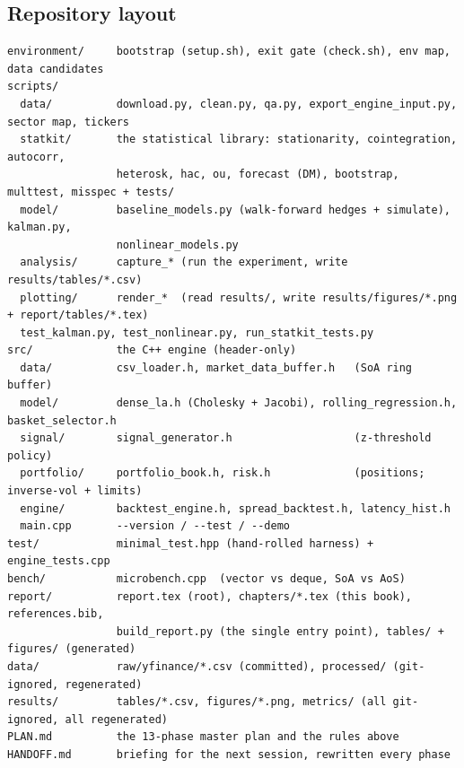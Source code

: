\subsection{Repository layout}
\label{sec:phasemap:layout}

\begin{verbatim}
environment/     bootstrap (setup.sh), exit gate (check.sh), env map, data candidates
scripts/
  data/          download.py, clean.py, qa.py, export_engine_input.py, sector map, tickers
  statkit/       the statistical library: stationarity, cointegration, autocorr,
                 heterosk, hac, ou, forecast (DM), bootstrap, multtest, misspec + tests/
  model/         baseline_models.py (walk-forward hedges + simulate), kalman.py,
                 nonlinear_models.py
  analysis/      capture_* (run the experiment, write results/tables/*.csv)
  plotting/      render_*  (read results/, write results/figures/*.png + report/tables/*.tex)
  test_kalman.py, test_nonlinear.py, run_statkit_tests.py
src/             the C++ engine (header-only)
  data/          csv_loader.h, market_data_buffer.h   (SoA ring buffer)
  model/         dense_la.h (Cholesky + Jacobi), rolling_regression.h, basket_selector.h
  signal/        signal_generator.h                   (z-threshold policy)
  portfolio/     portfolio_book.h, risk.h             (positions; inverse-vol + limits)
  engine/        backtest_engine.h, spread_backtest.h, latency_hist.h
  main.cpp       --version / --test / --demo
test/            minimal_test.hpp (hand-rolled harness) + engine_tests.cpp
bench/           microbench.cpp  (vector vs deque, SoA vs AoS)
report/          report.tex (root), chapters/*.tex (this book), references.bib,
                 build_report.py (the single entry point), tables/ + figures/ (generated)
data/            raw/yfinance/*.csv (committed), processed/ (git-ignored, regenerated)
results/         tables/*.csv, figures/*.png, metrics/ (all git-ignored, all regenerated)
PLAN.md          the 13-phase master plan and the rules above
HANDOFF.md       briefing for the next session, rewritten every phase
\end{verbatim}

